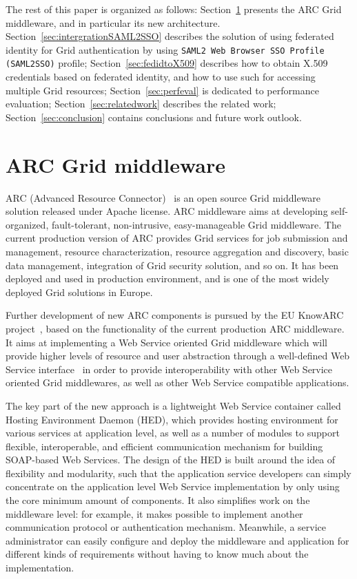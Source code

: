 \documentclass[conference]{IEEEtran}
\begin{document}
The rest of this paper is organized as follows: Section~\ref{sec:arcmiddleware} presents the 
ARC Grid middleware, and in particular its new architecture. Section~\ref{sec:intergrationSAML2SSO} 
describes the solution of using federated identity for 
Grid authentication by using \texttt{SAML2 Web Browser SSO Profile (SAML2SSO)} profile; 
Section~\ref{sec:fedidtoX509} describes
how to obtain X.509 credentials based on federated identity, and how to use such for 
accessing multiple Grid resources; Section~\ref{sec:perfeval} is dedicated to performance evaluation;
Section~\ref{sec:relatedwork} describes the related work; Section~\ref{sec:conclusion} 
contains conclusions and future work outlook.

\section{ARC Grid middleware}
\label{sec:arcmiddleware}

ARC (Advanced Resource Connector)~\cite{MEllert07} is an open source Grid middleware solution released 
under Apache license. ARC middleware aims at developing self-organized, 
fault-tolerant, non-intrusive, easy-manageable Grid middleware. 
The current production version of ARC provides Grid services for job submission and 
management, resource characterization, resource aggregation and discovery, basic data 
management, integration of Grid security solution, and so on. It has been 
deployed and used in production environment, and is one of the most widely deployed Grid
solutions in Europe.

Further development of new ARC components is pursued by the EU KnowARC project~\cite{KnowARClink}, 
based on the functionality of the current production ARC middleware. It aims at 
implementing a Web Service oriented Grid middleware which will provide higher levels of 
resource and user abstraction through a well-defined Web Service interface~\cite{KnowARCDesignlink} 
in order to provide interoperability with other Web Service oriented Grid middlewares, as well as 
other Web Service compatible applications.

The key part of the new approach is a lightweight Web 
Service container called Hosting Environment Daemon (HED), which provides hosting environment 
for various services at application level, as well as a number of modules to support flexible, 
interoperable, and efficient communication mechanism for building SOAP-based Web Services. 
The design of the HED is built around the idea of flexibility and modularity,
such that the application service developers can simply concentrate on the application 
level Web Service implementation by only using the core minimum amount of components. It 
also simplifies work on the middleware level: for example, it makes possible to implement another 
communication protocol or authentication mechanism. Meanwhile, a service administrator can easily 
configure and deploy the middleware and application for different kinds of requirements 
without having to know much about the implementation. 
\end{document}
